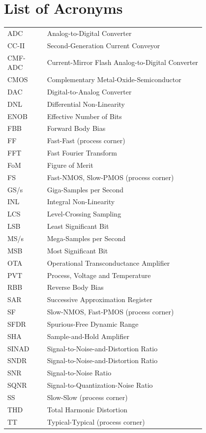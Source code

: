 \chapter*{List of Acronyms}

\begin{flushleft}
\begin{tabular}{l p{0.8\linewidth}}
ADC     & Analog-to-Digital Converter \\
CC-II   & Second-Generation Current Conveyor \\
CMF-ADC & Current-Mirror Flash Analog-to-Digital Converter \\
CMOS    & Complementary Metal-Oxide-Semiconductor \\
DAC     & Digital-to-Analog Converter \\
DNL     & Differential Non-Linearity \\
ENOB    & Effective Number of Bits \\
FBB     & Forward Body Bias \\
FF      & Fast-Fast (process corner) \\
FFT     & Fast Fourier Transform \\
FoM     & Figure of Merit \\
FS      & Fast-NMOS, Slow-PMOS (process corner) \\
GS/s    & Giga-Samples per Second \\
INL     & Integral Non-Linearity \\
LCS     & Level-Crossing Sampling \\
LSB     & Least Significant Bit \\
MS/s    & Mega-Samples per Second \\
MSB     & Most Significant Bit \\
OTA     & Operational Transconductance Amplifier \\
PVT     & Process, Voltage and Temperature \\
RBB     & Reverse Body Bias \\
SAR     & Successive Approximation Register \\
SF      & Slow-NMOS, Fast-PMOS (process corner) \\
SFDR    & Spurious-Free Dynamic Range \\
SHA     & Sample-and-Hold Amplifier \\
SINAD   & Signal-to-Noise-and-Distortion Ratio \\
SNDR    & Signal-to-Noise-and-Distortion Ratio \\
SNR     & Signal-to-Noise Ratio \\
SQNR    & Signal-to-Quantization-Noise Ratio \\
SS      & Slow-Slow (process corner) \\
THD     & Total Harmonic Distortion \\
TT      & Typical-Typical (process corner) \\
\end{tabular}
\end{flushleft}
